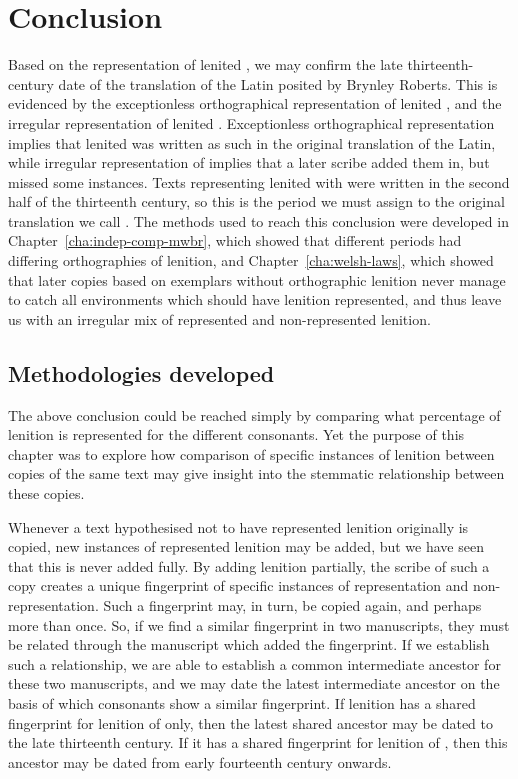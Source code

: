 \section{Conclusion}
\label{sec:dewi-conclusion}

Based on the representation of lenited , we may confirm the late thirteenth-century date of the translation of the Latin  posited by Brynley Roberts. This is evidenced by the exceptionless orthographical representation of lenited , and the irregular representation of lenited . Exceptionless orthographical representation implies that lenited  was written as such in the original translation of the Latin, while irregular representation of  implies that a later scribe added them in, but missed some instances. Texts representing lenited  with  were written in the second half of the thirteenth century, so this is the period we must assign to the original translation we call . The methods used to reach this conclusion were developed in Chapter~\ref{cha:indep-comp-mwbr}, which showed that different periods had differing orthographies of lenition, and Chapter~\ref{cha:welsh-laws}, which showed that later copies based on exemplars without orthographic lenition never manage to catch all environments which should have lenition represented, and thus leave us with an irregular mix of represented and non-represented lenition.

\subsection{Methodologies developed}
\label{sec:meth-devel}


The above conclusion could be reached simply by comparing what percentage of lenition is represented for the different consonants. Yet the purpose of this chapter was to explore how comparison of specific instances of lenition between copies of the same text may give insight into the stemmatic relationship between these copies.

Whenever a text hypothesised not to have represented lenition originally is copied, new instances of represented lenition may be added, but we have seen that this is never added fully. By adding lenition partially, the scribe of such a copy creates a unique fingerprint of specific instances of representation and non-representation. Such a fingerprint may, in turn, be copied again, and perhaps more than once. So, if we find a similar fingerprint in two manuscripts, they must be related through the manuscript which added the fingerprint. If we establish such a relationship, we are able to establish a common intermediate ancestor for these two manuscripts, and we may date the latest intermediate ancestor on the basis of which consonants show a similar fingerprint. If lenition has a shared fingerprint for lenition of  only, then the latest shared ancestor may be dated to the late thirteenth century. If it has a shared fingerprint for lenition of , then this ancestor may be dated from early fourteenth century onwards.

